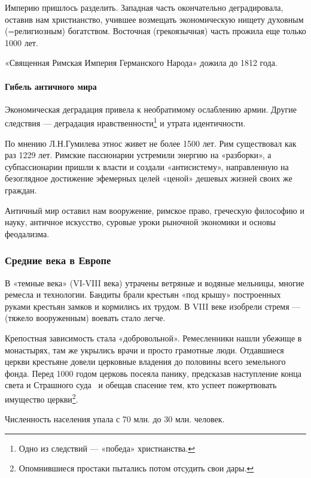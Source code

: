 Империю пришлось разделить. Западная часть окончательно деградировала, оставив нам христианство, учившее возмещать
экономическую нищету духовным (=религиозным) богатством. Восточная (грекоязычная) часть прожила еще только 1000 лет.


«Священная Римская Империя Германского Народа» дожила до 1812 года.

\paragraph[Гибель античного мира]{Гибель античного мира}

Экономическая деградация привела к необратимому ослаблению армии. Другие следствия — деградация
нравственности\footnote{Одно из следствий — «победа» христианства.} и утрата идентичности.


По мнению Л.Н.Гумилева этнос живет не более 1500 лет. Рим существовал как раз 1229 лет. Римские пассионарии устремили
энергию на «разборки», а субпассионарии пришли к власти и создали «антисистему», направленную на безоглядное достижение
эфемерных целей «ценой» дешевых жизней своих же граждан.


Античный мир оставил нам вооружение, римское право, греческую философию и науку, античное искусство, суровые уроки
рыночной экономики и основы феодализма.

\subsubsection[Средние века в Европе]{Средние века в Европе}

В «темные века» (\foreignlanguage{english}{VI}{}-\foreignlanguage{english}{VIII} века) утрачены ветряные и водяные
мельницы, многие ремесла и технологии. Бандиты брали крестьян «под крышу» построенных руками крестьян замков и
кормились их трудом. В \foreignlanguage{english}{VIII} веке изобрели стремя — (тяжело вооруженным) воевать стало легче.


Крепостная зависимость стала «добровольной». Ремесленники нашли убежище в монастырях, там же укрылись врачи и просто
грамотные люди. Отдавшиеся церкви крестьяне довели церковные владения до половины всего земельного фонда. Перед 1000
годом церковь посеяла панику, предсказав наступление конца света и Страшного суда \ и обещав спасение тем, кто успеет
пожертвовать имущество церкви\footnote{Опомнившиеся простаки пытались потом отсудить свои дары.}.


Численность населения упала с 70 млн. до 30 млн. человек.


